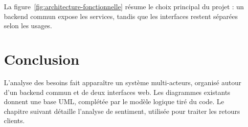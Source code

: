 La figure~\ref{fig:architecture-fonctionnelle} résume le choix principal du projet : un backend commun expose les services, tandis que les interfaces restent séparées selon les usages.

\section*{Conclusion}
L'analyse des besoins fait apparaître un système multi-acteurs, organisé autour d'un backend commun et de deux interfaces web. Les diagrammes existants donnent une base UML, complétée par le modèle logique tiré du code. Le chapitre suivant détaille l'analyse de sentiment, utilisée pour traiter les retours clients.
